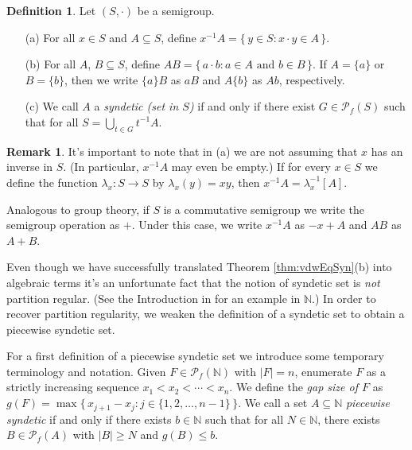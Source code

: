 \documentclass[12pt]{article}
\theoremstyle{plain}
\theoremstyle{definition}
\newtheorem{defn}[thm]{Definition}
\newtheorem{rmk}[thm]{Remark}
\newcommand{\bbN}{\mathbb{N}}
\newcommand{\Pf}{\mathcal{P}_f}
\begin{document}
\begin{defn}
  Let $(S, \cdot)$ be a semigroup.
  \begin{itemize}
    \item[(a)] For all $x \in S$ and $A \subseteq S$, define $x^{-1}A = \{\, y
      \in S : x \cdot y \in A \,\}$.
    
    \item[(b)] For all $A$, $B \subseteq S$, define $AB = \{\, a\cdot
      b : \mbox{$a \in A$ and $b \in B$} \,\}$. 
      If $A = \{a\}$ or $B = \{b\}$, then we write $\{a\}B$ as $aB$
      and $A\{b\}$ as $Ab$, respectively. 

    \item[(c)] We call $A$ a \textsl{syndetic (set in $S$)} if and
      only if there exist $G \in \Pf(S)$ such that for all $S =
      \bigcup_{t \in G} t^{-1}A$. 
  \end{itemize}
\end{defn}
\begin{rmk}
  It's important to note that in (a) we are not assuming that $x$ has
  an inverse in $S$.
  (In particular, $x^{-1}A$ may even be empty.)
  If for every $x \in S$ we define the function $\lambda_x \colon S
  \to S$ by $\lambda_x(y) = xy$, then $x^{-1}A = \lambda_x^{-1}[A]$. 

  Analogous to group theory, if $S$ is a commutative semigroup we
  write the semigroup operation as $+$. 
  Under this case, we write $x^{-1}A$ as $-x + A$ and $AB$ as $A +
  B$. 
\end{rmk}

Even though we have successfully translated Theorem
\ref{thm:vdwEqSyn}(b) into algebraic terms it's an unfortunate fact
that the notion of syndetic set is \textsl{not} partition regular. 
(See the Introduction in \cite{Bergelson:2001fk} for an example in
$\bbN$.)
In order to recover partition regularity, we weaken the definition of
a syndetic set to obtain a piecewise syndetic set.
 
For a first definition of a piecewise syndetic set we introduce some
temporary terminology and notation.
Given $F \in \Pf(\bbN)$ with $|F| = n$, enumerate $F$ as a strictly
increasing sequence $x_1 < x_2 < \cdots < x_n$. 
We define the \textsl{gap size of $F$} as $g(F) = \max\bigr\{\,
x_{j+1} - x_j : j \in \{1, 2, \ldots, n-1\} \,\bigl\}$.
We call a set $A \subseteq \bbN$ \textsl{piecewise syndetic} if and
only if there exists $b \in \bbN$ such that for all $N \in \bbN$,
there exists $B \in \Pf(A)$ with $|B| \ge N$ and $g(B) \le b$.
\end{document}
